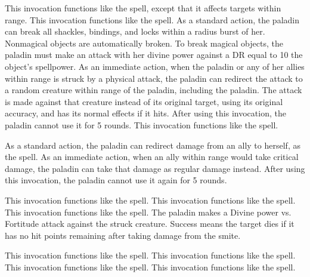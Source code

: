      This invocation functions like the  spell, except that it affects targets within \rngmed range.
     This invocation functions like the  spell.
    As a standard action, the paladin can break all shackles, bindings, and locks within a \arealarge radius burst of her.
    Nonmagical objects are automatically broken.
    To break magical objects, the paladin must make an attack with her divine power against a DR equal to 10 \add the object's spellpower.
    As an immediate action, when the paladin or any of her allies within \rngclose range is struck by a physical attack, the paladin can redirect the attack to a random creature within \rngclose range of the paladin, including the paladin.
    The attack is made against that creature instead of its original target, using its original accuracy, and has its normal effects if it hits.
    After using this invocation, the paladin cannot use it for 5 rounds.
     This invocation functions like the  spell.

    As a standard action, the paladin can redirect damage from an ally to herself, as the  spell.
    As an immediate action, when an ally within \rngmed range would take critical damage, the paladin can take that damage as regular damage instead.
    After using this invocation, the paladin cannot use it again for 5 rounds.

     This invocation functions like the 
    spell.
     This invocation functions like the  spell.
     This invocation functions like the 
    spell.
    The paladin makes a Divine power vs. Fortitude attack against the struck creature.
    Success means the target dies if it has no hit points remaining after taking damage from the smite.

     This invocation functions like the  spell.
     This invocation functions like the  spell.
     This invocation functions like the  spell.
     This invocation functions like the  spell.

